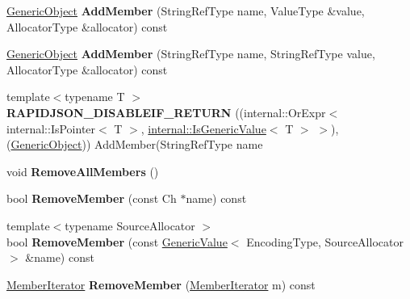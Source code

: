\begin{DoxyCompactItemize}
\item 
\mbox{\label{classGenericObject_a011a0dd06baf841e3f6e21a3c95db3c1}} 
\hyperlink{classGenericObject}{Generic\+Object} {\bfseries Add\+Member} (String\+Ref\+Type name, Value\+Type \&value, Allocator\+Type \&allocator) const
\item 
\mbox{\label{classGenericObject_a3af43681aea03c4313d689bcbf5e3363}} 
\hyperlink{classGenericObject}{Generic\+Object} {\bfseries Add\+Member} (String\+Ref\+Type name, String\+Ref\+Type value, Allocator\+Type \&allocator) const
\item 
\mbox{\label{classGenericObject_af361a4b677882964789201fc605541d0}} 
{\footnotesize template$<$typename T $>$ }\\{\bfseries R\+A\+P\+I\+D\+J\+S\+O\+N\+\_\+\+D\+I\+S\+A\+B\+L\+E\+I\+F\+\_\+\+R\+E\+T\+U\+RN} ((internal\+::\+Or\+Expr$<$ internal\+::\+Is\+Pointer$<$ T $>$, \hyperlink{structinternal_1_1IsGenericValue}{internal\+::\+Is\+Generic\+Value}$<$ T $>$ $>$),(\hyperlink{classGenericObject}{Generic\+Object})) Add\+Member(String\+Ref\+Type name
\item 
\mbox{\label{classGenericObject_a129ce3843a6658e620a7f740d9f44ee1}} 
void {\bfseries Remove\+All\+Members} ()
\item 
\mbox{\label{classGenericObject_aebeda9c2cac6afd56dda55caaf2c4a0c}} 
bool {\bfseries Remove\+Member} (const Ch $\ast$name) const
\item 
\mbox{\label{classGenericObject_a8e29dc07b992e71e35dd93a57f95842c}} 
{\footnotesize template$<$typename Source\+Allocator $>$ }\\bool {\bfseries Remove\+Member} (const \hyperlink{classGenericValue}{Generic\+Value}$<$ Encoding\+Type, Source\+Allocator $>$ \&name) const
\item 
\mbox{\label{classGenericObject_a006f76a33dada85c9d13e069cc43623d}} 
\hyperlink{classGenericMemberIterator}{Member\+Iterator} {\bfseries Remove\+Member} (\hyperlink{classGenericMemberIterator}{Member\+Iterator} m) const
\item 
\mbox{\label{classGenericObject_a29ad0490a4a088d57df7a9884f979a82}} 

\end{DoxyCompactItemize}
